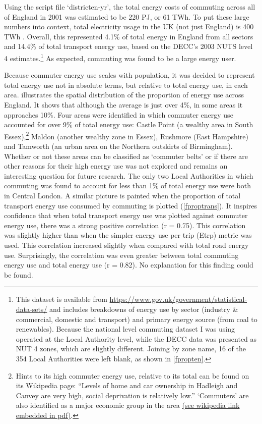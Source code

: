 \documentclass[a4paper, 11pt, twoside]{Thesis}
\begin{document}
Using the script file `districten-yr', the total energy costs of commuting
across all of England in 2001 was estimated to be 220 PJ, or 61 TWh.
To put these large numbers into context, total electricity usage in the UK
(not just England) is 400 TWh \citep{MacKay2009}. Overall, this represented
4.1\% of total energy in England from all sectors and 14.4\% of total transport
energy use, based on the DECC's 2003 NUTS level 4
estimates.\footnote{This
dataset is available from {\color{blue} \href{https://www.gov.uk/government/statistical-data-sets/total-final-energy-consumption-at-regional-and-local-authority level-2005-to-2010}{https://www.gov.uk/government/statistical-data-sets/}}
and includes breakdowns of energy use by sector (industry \& commercial, domestic and transport)
and primary energy source (from coal to renewables).
Because the national level commuting dataset I was using operated at the
Local Authority level, while the DECC data was presented as NUT 4 zones,
which are slightly different. Joining by zone name, 16 of the 354 Local
Authorities were left blank, as shown in \cref{fpropten}.
}
As expected, commuting was found to be a large energy user.

Because commuter energy use scales with population, it was decided to represent
total energy use not in absolute terms, but relative to total energy use,
in each area.  illustrates the spatial distribution of
the proportion of energy use across England. It shows that although the
average is just over 4\%, in some areas it approaches 10\%. Four areas
were identified in which commuter energy use accounted for over 9\% of total
energy use: Castle Point (a wealthy area in South
Essex),\footnote{Hints to its high commuter energy use, relative to its total
can be found on its Wikipedia page:
``Levels of home and car ownership in Hadleigh and Canvey are very high,
social deprivation is relatively low.'' `Commuters' are also
identified as a major economic group in the area {\color{blue}
\href{http://tinyurl.com/qfkb9ta}
{(see wikipedia link embedded in pdf)}}.
}
Maldon (another wealthy zone in Essex),
Rushmore (East Hampshire) and Tamworth (an urban area on the Northern
outskirts of Birmingham). Whether or not these areas can be classified as
`commuter belts' or if there are other reasons for their high energy use was
not explored and remains an interesting question for future research.
The only two Local Authorities in which commuting was found to account
for less than 1\% of total energy use were both in Central London.
A similar picture is painted when the proportion of total transport
energy use consumed by commuting is plotted (\cref{fproptrans}).
It inspires confidence that when total transport energy use was plotted
against commuter energy use, there was a strong positive correlation
(r = 0.75). This correlation was slightly higher than when
the simpler energy use per trip (Etrp) metric was used.
This correlation increased slightly when compared with
total road energy use. Surprisingly, the correlation
was even greater between total commuting energy use and total energy use
(r = 0.82). No explanation for this finding could be found.
\end{document}
